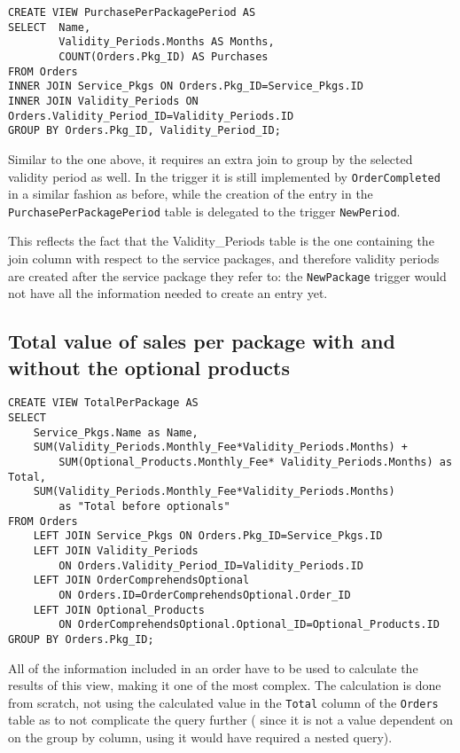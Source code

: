 \begin{lstlisting}[style=SQL]
CREATE VIEW PurchasePerPackagePeriod AS
SELECT  Name,
        Validity_Periods.Months AS Months,
        COUNT(Orders.Pkg_ID) AS Purchases
FROM Orders
INNER JOIN Service_Pkgs ON Orders.Pkg_ID=Service_Pkgs.ID
INNER JOIN Validity_Periods ON Orders.Validity_Period_ID=Validity_Periods.ID
GROUP BY Orders.Pkg_ID, Validity_Period_ID;
\end{lstlisting}

Similar to the one above, it requires an extra join to group by the selected validity period as well. In the trigger it is still implemented by \texttt{OrderCompleted} in a similar fashion as before, while the creation of the entry in the \texttt{PurchasePerPackagePeriod} table is delegated to the trigger \texttt{NewPeriod}.

This reflects the fact that the Validity\_Periods table is the one containing the join column with respect to the service packages, and therefore validity periods are created after the service package they refer to: the \texttt{NewPackage} trigger would not have all the information needed to create an entry yet.

\subsection{Total value of sales per package with and without the optional products}

\begin{lstlisting}[style=SQL]
CREATE VIEW TotalPerPackage AS
SELECT
    Service_Pkgs.Name as Name,
    SUM(Validity_Periods.Monthly_Fee*Validity_Periods.Months) +
        SUM(Optional_Products.Monthly_Fee* Validity_Periods.Months) as Total,
    SUM(Validity_Periods.Monthly_Fee*Validity_Periods.Months)
        as "Total before optionals"
FROM Orders
    LEFT JOIN Service_Pkgs ON Orders.Pkg_ID=Service_Pkgs.ID
    LEFT JOIN Validity_Periods
        ON Orders.Validity_Period_ID=Validity_Periods.ID
    LEFT JOIN OrderComprehendsOptional
        ON Orders.ID=OrderComprehendsOptional.Order_ID
    LEFT JOIN Optional_Products
        ON OrderComprehendsOptional.Optional_ID=Optional_Products.ID
GROUP BY Orders.Pkg_ID;

\end{lstlisting}

All of the information included in an order have to be used to calculate the results of this view, making it one of the most complex. The calculation is done from scratch, not using the calculated value in the \texttt{Total}  column of the \texttt{Orders}  table as to not complicate the query further ( since it is not a value dependent on on the group by column, using it would have required a nested query).

